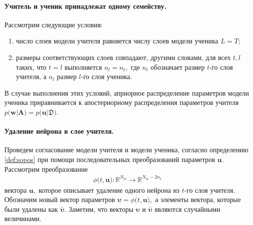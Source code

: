 \paragraph{Учитель и ученик принадлежат одному семейству.}
\label{section:one:space}
Рассмотрим следующие условия:
\begin{enumerate}[1)]
    \item число слоев модели учителя равняется числу слоев модели ученика $L=T$;
    \item размеры соответствующих слоев совпадают, другими словами, для всех $t, l$ таких, что $t=l$ выполняется $n_l = n_t,$ где $n_t$ обозначает размер $t$-го слоя учителя, а $n_l$ размер $l$-го слоя ученика.
\end{enumerate}
В случае выполнения этих условий, априорное распределение параметров модели ученика приравнивается к апостериорному распределения параметров учителя $p\bigr(\mathbf{w}|\mathbf{A}\bigr) = p\bigr(\mathbf{u}|\mathfrak{D}\bigr)$.

\paragraph{Удаление нейрона в слое учителя.}
Проведем согласование модели учителя и модели ученика, согласно определению \ref{def:sopos} при помощи последовательных преобразований параметров $\mathbf{u}$. Рассмотрим преобразование
\[
\label{eq:ap:2}
\begin{aligned}
\phi\bigr(t, \mathbf{u}\bigr) : \mathbb{R}^{N_{\text{tr}}} \to \mathbb{R}^{N_{\text{tr}}-2n_t}
\end{aligned}
\]
вектора $\mathbf{u},$ которое описывает удаление одного нейрона из $t$-го слоя учителя.
Обозначим новый вектор параметров $\bm{\upsilon} =  \phi\bigr(t, \mathbf{u}\bigr),$ а элементы вектора, которые были удалены как $\bar{\bm{\upsilon}}.$ Заметим, что векторы $\bm{\upsilon}$ и $\bar{\bm{\upsilon}}$ являются случайными величинами. 

